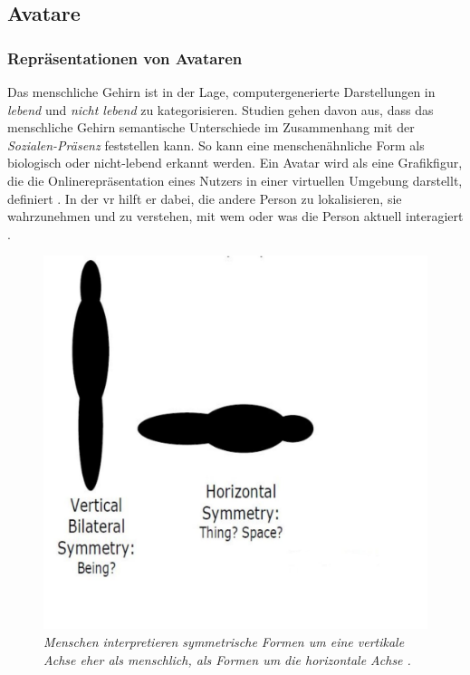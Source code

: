 \documentclass[a4paper,11pt]{article}%
\renewcommand{\\}{\vspace*{0.5\baselineskip} \newline}
\begin{document}

\newpage

\subsection{Avatare}
\label{Avatare}
\subsubsection{Repräsentationen von Avataren}

Das menschliche Gehirn ist in der Lage, computergenerierte Darstellungen in \textit{lebend} und \textit{nicht lebend} zu kategorisieren. Studien gehen davon aus, dass das menschliche Gehirn semantische Unterschiede im Zusammenhang mit der \textit{Sozialen-Präsenz} feststellen kann. So kann eine menschenähnliche Form als biologisch oder nicht-lebend erkannt werden. 
Ein Avatar wird als eine Grafikfigur, die die Onlinerepräsentation eines Nutzers in einer virtuellen Umgebung darstellt, definiert \citep[S.1]{neustaedter2009presenting}. In der \ac{vr} hilft er dabei, die andere Person zu lokalisieren, sie wahrzunehmen und zu verstehen, mit wem oder was die Person aktuell interagiert \citep{pan2017impact}.

	\begin{figure}[b!]
		\begin{footnotesize}
		\centering
			\includegraphics[scale= 0.3]{Abbildungen/Symmetry.JPG}
			\caption[Vertical and horizontal beeings]{\textit{Menschen interpretieren symmetrische Formen um eine vertikale Achse eher als menschlich, als Formen um die horizontale Achse \citep{biocca2002defining}. }}
			\label{vertical_horizontal}
		\end{footnotesize}
	\end{figure}
\end{document}
